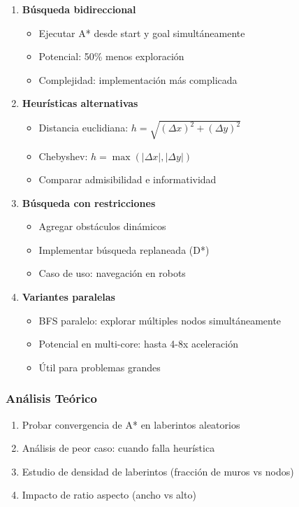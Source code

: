 \documentclass[12pt,a4paper]{article}
\begin{document}
\begin{enumerate}
    \item \textbf{Búsqueda bidireccional}
    \begin{itemize}
        \item Ejecutar A* desde start y goal simultáneamente
        \item Potencial: 50\% menos exploración
        \item Complejidad: implementación más complicada
    \end{itemize}
    
    \item \textbf{Heurísticas alternativas}
    \begin{itemize}
        \item Distancia euclidiana: $h = \sqrt{(\Delta x)^2 + (\Delta y)^2}$
        \item Chebyshev: $h = \max(|\Delta x|, |\Delta y|)$
        \item Comparar admisibilidad e informatividad
    \end{itemize}
    
    \item \textbf{Búsqueda con restricciones}
    \begin{itemize}
        \item Agregar obstáculos dinámicos
        \item Implementar búsqueda replaneada (D*)
        \item Caso de uso: navegación en robots
    \end{itemize}
    
    \item \textbf{Variantes paralelas}
    \begin{itemize}
        \item BFS paralelo: explorar múltiples nodos simultáneamente
        \item Potencial en multi-core: hasta 4-8x aceleración
        \item Útil para problemas grandes
    \end{itemize}
\end{enumerate}

\subsubsection{Análisis Teórico}

\begin{enumerate}
    \item Probar convergencia de A* en laberintos aleatorios
    \item Análisis de peor caso: cuando falla heurística
    \item Estudio de densidad de laberintos (fracción de muros vs nodos)
    \item Impacto de ratio aspecto (ancho vs alto)
\end{enumerate}
\end{document}
